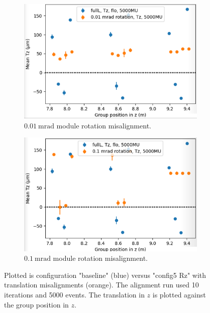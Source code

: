 \begin{figure}
  \centering
  \begin{subfigure}[b]{0.48\textwidth}
    \centering
    \includegraphics[width=\textwidth]{plots/misalign_rota/001_rot_Tz.png}
    \caption{$\SI{0.01}{\milli\radian}$ module rotation misalignment.}
    \label{fig:001Tz}
  \end{subfigure}
  \hfill
  \begin{subfigure}[b]{0.48\textwidth}
    \centering
    \includegraphics[width=\textwidth]{plots/misalign_rota/01_rot_Tz.png}
    \caption{$\SI{0.1}{\milli\radian}$ module rotation misalignment.}
    \label{fig:01Tz}
  \end{subfigure}
  \caption{Plotted is configuration "baseline" (blue) versus "config5 Rz" with translation misalignments (orange). The alignment run used 10 iterations and 5000 events. The translation in $z$ is plotted against the group position in $z$.}
  \label{fig:mis_rot_Tx}
\end{figure}

